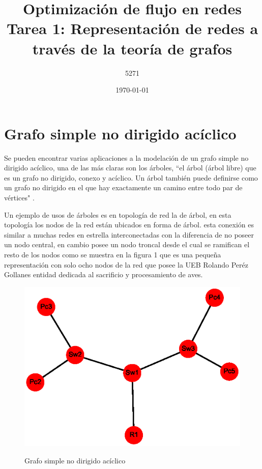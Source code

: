 \documentclass{article}
\title{Optimización de flujo en redes \linebreak 
Tarea 1: Representación de redes a través de la teoría de grafos}
\author{5271}
\date{\today}
\begin{document}
\maketitle
\section{ Grafo simple no dirigido acíclico}
Se pueden encontrar varias aplicaciones a la modelación de un grafo simple no dirigido acíclico, una de las más claras son los árboles, ``el árbol (árbol libre) que es un grafo no dirigido, conexo y acíclico. Un árbol también puede definirse como un grafo no dirigido en el que hay exactamente un camino entre todo par de vértices" \cite{gf1}.

Un ejemplo de usos de árboles es en topología de red la de árbol, en esta topología los nodos de la red están ubicados en forma de árbol. esta conexión es similar a muchas redes en estrella interconectadas con la diferencia de no poseer un nodo central, en cambio posee un nodo troncal desde el cual se ramifican el resto de los nodos como se muestra en la figura 1 que es una pequeña representación con solo ocho nodos de la red que posee la UEB Rolando Peréz Gollanes entidad dedicada al sacrificio y procesamiento de aves.
 
 
\begin{center}

\end{center}
\begin{figure}[h]
\begin{center}
\includegraphics[scale=0.7]{Graf1.eps}\\
\caption{Grafo simple no dirigido acíclico}
\end{center}
\end{figure}
\end{document}
